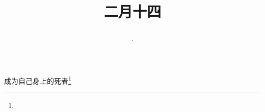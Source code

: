 \title{\date[d=23,m=3,y=2024][year:cn-y,年,month:cn,day:cn,日,·,weekday]·二月十四 }
成为自己身上的死者\footnote{ }

